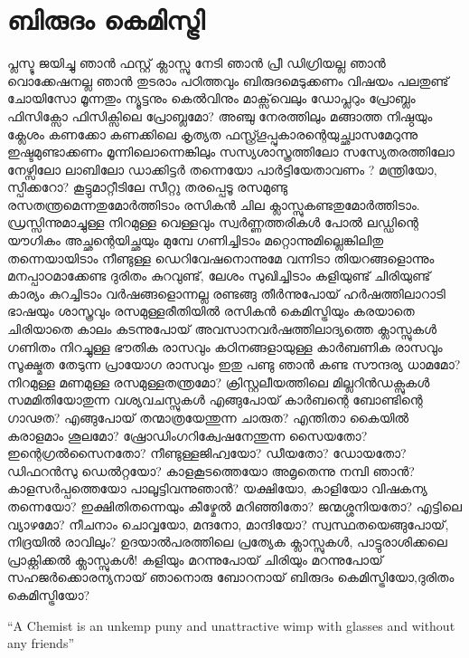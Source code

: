 \section{ബിരുദം കെമിസ്ട്രി}
\obeylines
\noindent
പ്ലസ്ടു ജയിച്ചു ഞാൻ ഫസ്റ്റ് ക്ലാസ്സു നേടി ഞാൻ 
പ്രീ ഡിഗ്രിയല്ല ഞാൻ വൊക്കേഷനല്ല ഞാൻ 
തുടരാം പഠിത്തവും ബിരുദമെടുക്കണം  
വിഷയം പലതുണ്ട് ചോയിസോ മൂന്നതും 
ന്യൂട്ടനും കെൽവിനും  മാക്സ്‌വെലും  ഡോപ്ലറും   
പ്രോബ്ലം ഫിസിക്സോ ഫിസിക്സിലെ പ്രോബ്ലമോ? 
അഞ്ചു നേരത്തിലും മങ്ങാത്ത നിഷ്ഠയും 
ക്ലേശം കണക്കോ കണക്കിലെ കൃത്യത 
ഫസ്റ്റ്ഗ്രൂപ്പുകാരന്റെയുച്ഛ്വാസമേറുന്നു 
ഇഷ്ടമുണ്ടാക്കണം മൂന്നിലൊന്നെങ്കിലും 
സസ്യശാസ്ത്രത്തിലോ സസ്യേതരത്തിലോ 
നേഴ്സിലോ ലാബിലോ ഡാക്കിട്ടർ തന്നെയോ 
പാർട്ടിയേതാവണം ? മന്ത്രിയോ, സ്പീക്കറോ? 
കൂട്ടുമാറ്റീടിലേ സീറ്റു തരപ്പെടൂ
രസമുണ്ടു രസതന്ത്രമെന്നതുമോർത്തിടാം 
രസികൻ ചില ക്ലാസ്സുകണ്ടതുമോർത്തിടാം. 
ഡ്രസ്സിന്നുമാച്ചുള്ള നിറമുള്ള വെള്ളവും  
സ്വർണ്ണത്തരികൾ പോൽ ലഡ്ഡിന്റെ യൗഗികം  
അച്ഛന്റെയിച്ഛയും മുമ്പേ ഗണിച്ചിടാം  
മറ്റൊന്നുമില്ലെങ്കിലിതു തന്നെയായിടാം  
നീണ്ടുള്ള ഡെറിവേഷനൊന്നുമേ വന്നിടാ 
തിയറങ്ങളൊന്നും മനപ്പാഠമാക്കേണ്ട 
ദുരിതം കുറവുണ്ട്, ലേശം സുഖിച്ചിടാം  
കളിയുണ്ട് ചിരിയുണ്ട് കാര്യം കുറച്ചിടാം  
വർഷങ്ങളൊന്നല്ല രണ്ടങ്ങു തീർന്നുപോയ് 
ഹർഷത്തിലാറാടി ഭാഷയും ശാസ്ത്രവും 
രസമുള്ളരീതിയിൽ രസികൻ കെമിസ്ട്രിയും 
കരയാതെ ചിരിയാതെ കാലം കടന്നുപോയ് 
അവസാനവർഷത്തിലാദ്യത്തെ ക്ലാസ്സുകൾ 
ഗണിതം നിറച്ചുള്ള ഭൗതിക രാസവും 
കഠിനങ്ങളായുള്ള കാർബണിക രാസവും 
സൂക്ഷ്മത തേടുന്ന പ്രായോഗ രാസവും  
ഇതു പണ്ടു ഞാൻ കണ്ട സൗന്ദര്യ ധാമമോ?
നിറമുള്ള മണമുള്ള രസമുള്ളതന്ത്രമോ?
ക്രിസ്റ്റലീയത്തിലെ മില്ലറിൻഡക്സുകൾ  
സമമിതിയോതുന്ന വശ്യവചസ്സുകൾ    
എങ്ങുപോയ് കാർബന്റെ ബോണ്ടിന്റെ ഗാഢത? 
എങ്ങുപോയ് തന്മാത്രയേന്തുന്ന ചാരുത?  
എന്തിതാ കൈയിൽ കരാളമാം ശൂലമോ?
ഷ്രോഡിംഗറിക്വേഷനേന്തുന്ന സൈയതോ?  
ഇന്റെഗ്രൽസൈനതോ? നീണ്ടുള്ളജിഹ്വയോ?  
ഡീയതോ?  ഡോയതോ? ഡിഫറൻസു ഡെൽറ്റയോ?   
കാളകൂടത്തെയോ അമൃതെന്നു നമ്പി ഞാൻ? 
കാളസർപ്പത്തെയോ പാലൂട്ടിവന്നുഞാൻ? 
യക്ഷിയോ, കാളിയോ വിഷകന്യ തന്നെയോ? 
ഇക്ഷിതിതന്നെയും കീഴ്മേൽ മറിഞ്ഞിതോ? 
ജന്മശ്ശനിയതോ? എട്ടിലെ വ്യാഴമോ?  
നീചനാം ചൊവ്വയോ, മന്ദനോ, മാന്ദിയോ? 
സ്വസ്ഥതയെങ്ങുപോയ്, നിദ്രയിൽ രാവിലും? 
ഉദയാൽപരത്തിലെ പ്രത്യേക ക്ലാസ്സുകൾ, 
പാട്ടുരാശിക്കലെ പ്രാക്റ്റിക്കൽ ക്ലാസ്സുകൾ! 
കളിയും മറന്നുപോയ് ചിരിയും മറന്നുപോയ്
സഹജർക്കൊരന്യനായ് ഞാനൊരു ബോറനായ് 
ബിരുദം കെമിസ്ട്രിയോ,ദുരിതം കെമിസ്ട്രിയോ? 
\begin{center}
“A Chemist  is an unkemp puny and unattractive wimp 
with glasses and without any friends”
\end{center}
